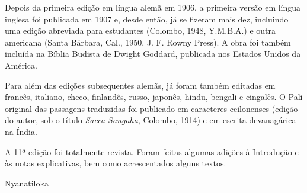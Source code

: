 Depois da primeira edição em língua alemã em 1906, a primeira versão em língua
inglesa foi publicada em 1907 e, desde então, já se fizeram mais dez, incluindo
uma edição abreviada para estudantes (Colombo, 1948, Y.M.B.A.) e outra americana
(Santa Bárbara, Cal., 1950, J. F. Rowny Press). A obra foi também incluída na
Bíblia Budista de Dwight Goddard, publicada nos Estados Unidos da América.

Para além das edições subsequentes alemãs, já foram também editadas em francês,
italiano, checo, finlandês, russo, japonês, hindu, bengali e cingalês. O Pāli
original das passagens traduzidas foi publicado em caracteres ceilonenses
(edição do autor, sob o título \emph{Sacca-Sangaha}, Colombo, 1914) e em escrita
devanagárica na Índia.

A 11ª edição foi totalmente revista. Foram feitas algumas adições à Introdução e
às notas explicativas, bem como acrescentados alguns textos.

\bigskip

{\raggedleft
  Nyanatiloka
\par}

